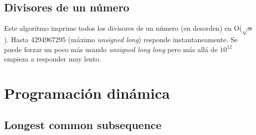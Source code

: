 \documentclass[10pt,a4paper,twoside]{article}
\begin{document}
\subsection{Divisores de un número}
Este algoritmo imprime todos los divisores de un número (en desorden) en O($\sqrt{n}$).
Hasta 4294967295 (máximo \textit{unsigned long}) responde instantaneamente. Se puede
forzar un poco más usando \textit{unsigned long long} pero más allá de $10^{12}$ empieza a
responder muy lento.




\section{Programación dinámica}
\subsection{Longest common subsequence}

\end{document}
